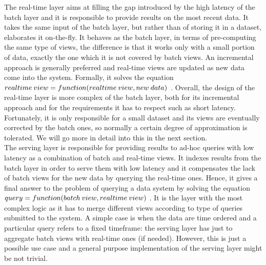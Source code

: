 The real-time layer aims at filling the gap introduced by the high latency of the batch layer and it is responsible to provide results on the most recent data. It takes the same input of the batch layer, but rather than of storing it in a dataset, elaborates it on-the-fly. It behaves as the batch layer, in terms of pre-computing the same type of views, the difference is that it works only with a small portion of data, exactly the one which it is not covered by batch views. An incremental approach is generally preferred and real-time views are updated as new data come into the system. Formally, it solves the equation $real\-time \: view = function(real\-time \: view, new \: data)$ \cite{bib4}. Overall, the design of the real-time layer is more complex of the batch layer, both for its incremental approach and for the requirements it has to respect such as short latency. Fortunately, it is only responsible for a small dataset and its views are eventually corrected by the batch ones, so normally a certain degree of approximation is tolerated. We will go more in detail into this in the next section.
\\
The serving layer is responsible for providing results to ad-hoc queries with low latency as a combination of batch and real-time views. It indexes results from the batch layer in order to serve them with low latency and it compensates the lack of batch views for the new data by querying the real-time ones. Hence, it gives a final answer to the problem of querying a data system by solving the equation $query = function(batch \: view, real\-time \: view)$ \cite{bib4}. It is the layer with the most complex logic as it has to merge different views according to type of queries submitted to the system. A simple case is when the data are time ordered and a particular query refers to a fixed timeframe: the serving layer has just to aggregate batch views with real-time ones (if needed). However, this is just a possible use case and a general purpose implementation of the serving layer might be not trivial.\\

